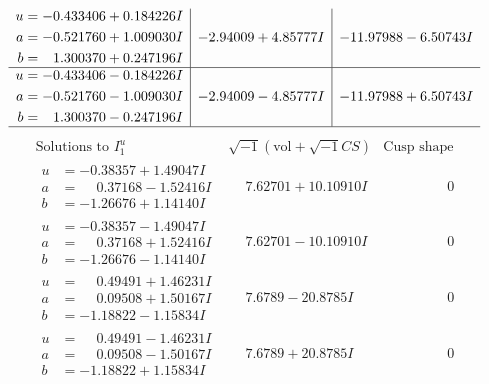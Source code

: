 \documentclass[1p]{elsarticle_modified}
\theoremstyle{definition}
\newcommand{\I}{\sqrt{-1}}
\begin{document}
$$\begin{array}{c|c|c}
\begin{aligned}
u &= -0.433406 + 0.184226 I \\
a &= -0.521760 + 1.009030 I \\
b &= \phantom{-}1.300370 + 0.247196 I\end{aligned}
 & -2.94009 + 4.85777 I & -11.97988 - 6.50743 I \\ \hline\begin{aligned}
u &= -0.433406 - 0.184226 I \\
a &= -0.521760 - 1.009030 I \\
b &= \phantom{-}1.300370 - 0.247196 I\end{aligned}
 & -2.94009 - 4.85777 I & -11.97988 + 6.50743 I\\
 \hline 
 \end{array}$$\newpage$$\begin{array}{c|c|c}  
\text{Solutions to }I^u_{1}& \I (\text{vol} + \sqrt{-1}CS) & \text{Cusp shape}\\
 \hline 
\begin{aligned}
u &= -0.38357 + 1.49047 I \\
a &= \phantom{-}0.37168 - 1.52416 I \\
b &= -1.26676 + 1.14140 I\end{aligned}
 & \phantom{-}7.62701 + 10.10910 I & \phantom{-0.000000 } 0 \\ \hline\begin{aligned}
u &= -0.38357 - 1.49047 I \\
a &= \phantom{-}0.37168 + 1.52416 I \\
b &= -1.26676 - 1.14140 I\end{aligned}
 & \phantom{-}7.62701 - 10.10910 I & \phantom{-0.000000 } 0 \\ \hline\begin{aligned}
u &= \phantom{-}0.49491 + 1.46231 I \\
a &= \phantom{-}0.09508 + 1.50167 I \\
b &= -1.18822 - 1.15834 I\end{aligned}
 & \phantom{-}7.6789 - 20.8785 I & \phantom{-0.000000 } 0 \\ \hline\begin{aligned}
u &= \phantom{-}0.49491 - 1.46231 I \\
a &= \phantom{-}0.09508 - 1.50167 I \\
b &= -1.18822 + 1.15834 I\end{aligned}
 & \phantom{-}7.6789 + 20.8785 I & \phantom{-0.000000 } 0 \\ \hline\begin{aligned}

\end{aligned}
\end{array}$$
\end{document}
